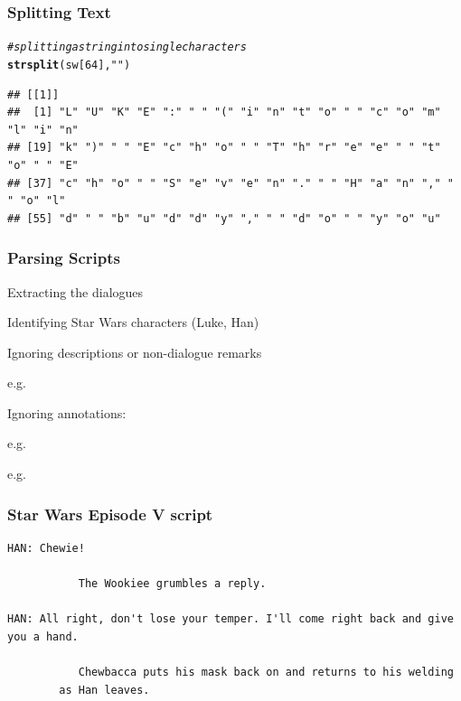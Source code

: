 \documentclass[12pt]{beamer}\usepackage[]{graphicx}\usepackage[]{color}
\makeatletter
\newcommand{\hlnum}[1]{\textcolor[rgb]{0.686,0.059,0.569}{#1}}%
\newcommand{\hlstr}[1]{\textcolor[rgb]{0.192,0.494,0.8}{#1}}%
\newcommand{\hlcom}[1]{\textcolor[rgb]{0.678,0.584,0.686}{\textit{#1}}}%
\newcommand{\hlstd}[1]{\textcolor[rgb]{0.345,0.345,0.345}{#1}}%
\newcommand{\hlkwd}[1]{\textcolor[rgb]{0.737,0.353,0.396}{\textbf{#1}}}%
\newenvironment{kframe}{%
 \def\at@end@of@kframe{}%
 \ifinner\ifhmode%
  \def\at@end@of@kframe{\end{minipage}}%
  \begin{minipage}{\columnwidth}%
 \fi\fi%
 \def\FrameCommand##1{\hskip\@totalleftmargin \hskip-\fboxsep
 \colorbox{shadecolor}{##1}\hskip-\fboxsep
     \hskip-\linewidth \hskip-\@totalleftmargin \hskip\columnwidth}%
 \MakeFramed {\advance\hsize-\width
   \@totalleftmargin\z@ \linewidth\hsize
   \@setminipage}}%
 {\par\unskip\endMakeFramed%
 \at@end@of@kframe}
\newenvironment{knitrout}{}{} %
\makeatother
\begin{document}

\begin{frame}[fragile]
\frametitle{Splitting Text}

\begin{knitrout}\tiny
{}\color{fgcolor}\begin{kframe}
\begin{alltt}
\hlcom{# splitting a string into single characters}
\hlkwd{strsplit}\hlstd{(sw[}\hlnum{64}\hlstd{],} \hlstr{""}\hlstd{)}
\end{alltt}
\begin{verbatim}
## [[1]]
##  [1] "L" "U" "K" "E" ":" " " "(" "i" "n" "t" "o" " " "c" "o" "m" "l" "i" "n"
## [19] "k" ")" " " "E" "c" "h" "o" " " "T" "h" "r" "e" "e" " " "t" "o" " " "E"
## [37] "c" "h" "o" " " "S" "e" "v" "e" "n" "." " " "H" "a" "n" "," " " "o" "l"
## [55] "d" " " "b" "u" "d" "d" "y" "," " " "d" "o" " " "y" "o" "u"
\end{verbatim}
\end{kframe}
\end{knitrout}

\end{frame}


\begin{frame}
\frametitle{Parsing Scripts}

\bi
  \item Extracting the dialogues
  \item Identifying Star Wars characters (Luke, Han)
  \item Ignoring descriptions or non-dialogue remarks
  \bi
    \item e.g. 
  \ei
  \item Ignoring annotations: 
  \bi
    \item e.g. 
    \item e.g. 
  \ei
\ei
\eb

\end{frame}



\begin{frame}[fragile]
\frametitle{Star Wars Episode V script}

{\scriptsize
\begin{verbatim}
HAN: Chewie!

           The Wookiee grumbles a reply.

HAN: All right, don't lose your temper. I'll come right back and give 
you a hand.

           Chewbacca puts his mask back on and returns to his welding
        as Han leaves.
\end{verbatim}
}

\end{frame}
\end{document}
